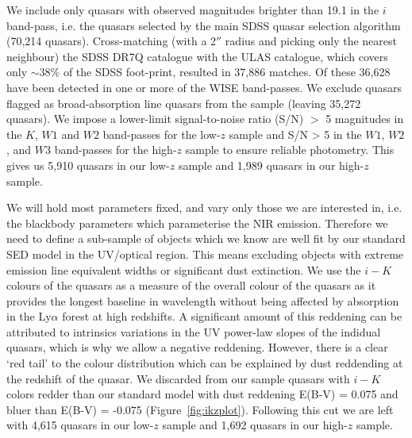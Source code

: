 We include only quasars with observed magnitudes brighter than 19.1 in the $i$ band-pass, i.e. the quasars selected by the main SDSS quasar selection algorithm (70,214 quasars). 
Cross-matching (with a 2$''$ radius and picking only the nearest neighbour) the SDSS DR7Q catalogue with the ULAS catalogue, which covers only $\sim 38$\% of the SDSS foot-print, resulted in 37,886 matches. 
Of these 36,628 have been detected in one or more of the WISE band-passes. 
We exclude quasars flagged as broad-absorption line quasars from the sample (leaving 35,272 quasars).
We impose a lower-limit signal-to-noise ratio (S/N) $>$ 5 magnitudes in the $K$, $W1$ and $W2$ band-passes for the low-$z$ sample and S/N > 5 in the $W1$, $W2$, and $W3$ band-passes for the high-$z$ sample to ensure reliable photometry. 
This gives us 5,910 quasars in our low-$z$ sample and 1,989 quasars in our high-$z$ sample. 

We will hold most parameters fixed, and vary only those we are interested in, i.e. the blackbody parameters which parameterise the NIR emission. 
Therefore we need to define a sub-sample of objects which we know are well fit by our standard SED model in the UV/optical region. 
This means excluding objects with extreme emission line equivalent widths or significant dust extinction.
We use the $i-K$ colours of the quasars as a measure of the overall colour of the quasars as it provides the longest baseline in wavelength without being affected by absorption in the Ly$\alpha$ forest at high redshifts. 
A significant amount of this reddening can be attributed to intrinsics variations in the UV power-law slopes of the indidual quasars, which is why we allow a negative reddening. However, there is a clear `red tail' to the colour distribution which can be explained by dust reddending at the redshift of the quasar.
We discarded from our sample quasars with $i - K$ colors redder than our standard model with dust reddening E(B-V) = 0.075 and bluer than E(B-V) = -0.075 (Figure~\ref{fig:ikzplot}). 
Following this cut we are left with 4,615 quasars in our low-$z$ sample and 1,692 quasars in our high-$z$ sample. 

